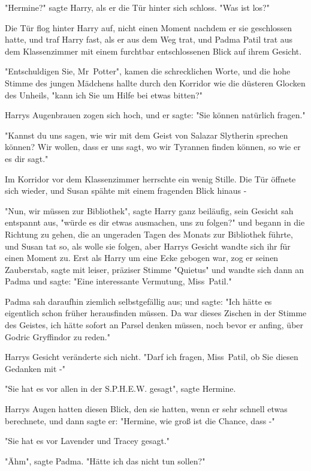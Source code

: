 {"Hermine?" sagte Harry, als er die Tür hinter sich schloss. "Was ist los?"

Die Tür flog hinter Harry auf, nicht einen Moment nachdem er sie geschlossen hatte, und traf Harry fast, als er aus dem Weg trat, und Padma Patil trat aus dem Klassenzimmer mit einem furchtbar entschlossenen Blick auf ihrem Gesicht.

"Entschuldigen Sie, Mr~Potter", kamen die schrecklichen Worte, und die hohe Stimme des jungen Mädchens hallte durch den Korridor wie die düsteren Glocken des Unheils, "kann ich Sie um Hilfe bei etwas bitten?"

Harrys Augenbrauen zogen sich hoch, und er sagte: "Sie können natürlich fragen."

"Kannst du uns sagen, wie wir mit dem Geist von Salazar Slytherin sprechen können? Wir wollen, dass er uns sagt, wo wir Tyrannen finden können, so wie er es dir sagt."

Im Korridor vor dem Klassenzimmer herrschte ein wenig Stille. Die Tür öffnete sich wieder, und Susan spähte mit einem fragenden Blick hinaus -

"Nun, wir müssen zur Bibliothek", sagte Harry ganz beiläufig, sein Gesicht sah entspannt aus, "würde es dir etwas ausmachen, uns zu folgen?" und begann in die Richtung zu gehen, die an ungeraden Tagen des Monats zur Bibliothek führte, und Susan tat so, als wolle sie folgen, aber Harrys Gesicht wandte sich ihr für einen Moment zu. Erst als Harry um eine Ecke gebogen war, zog er seinen Zauberstab, sagte mit leiser, präziser Stimme "Quietus" und wandte sich dann an Padma und sagte: "Eine interessante Vermutung, Miss~Patil."

Padma sah daraufhin ziemlich selbstgefällig aus; und sagte: "Ich hätte es eigentlich schon früher herausfinden müssen. Da war dieses Zischen in der Stimme des Geistes, ich hätte sofort an Parsel denken müssen, noch bevor er anfing, über Godric Gryffindor zu reden."

Harrys Gesicht veränderte sich nicht. "Darf ich fragen, Miss~Patil, ob Sie diesen Gedanken mit -"

"Sie hat es vor allen in der S.P.H.E.W. gesagt", sagte Hermine.

Harrys Augen hatten diesen Blick, den sie hatten, wenn er sehr schnell etwas berechnete, und dann sagte er: "Hermine, wie groß ist die Chance, dass -"

"Sie hat es vor Lavender und Tracey gesagt."

"Ähm", sagte Padma. "Hätte ich das nicht tun sollen?"

}
